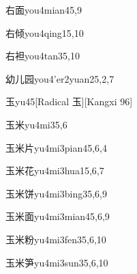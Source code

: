 \begin{verbete}{右面}{you4mian4}{5,9}
\end{verbete}

\begin{verbete}{右倾}{you4qing1}{5,10}
\end{verbete}

\begin{verbete}{右袒}{you4tan3}{5,10}
\end{verbete}

\begin{verbete}{幼儿园}{you4'er2yuan2}{5,2,7}
\end{verbete}

\begin{verbete}{玉}{yu4}{5}[Radical 玉][Kangxi 96]
\end{verbete}

\begin{verbete}{玉米}{yu4mi3}{5,6}
\end{verbete}

\begin{verbete}{玉米片}{yu4mi3pian4}{5,6,4}
\end{verbete}

\begin{verbete}{玉米花}{yu4mi3hua1}{5,6,7}
\end{verbete}

\begin{verbete}{玉米饼}{yu4mi3bing3}{5,6,9}
\end{verbete}

\begin{verbete}{玉米面}{yu4mi3mian4}{5,6,9}
\end{verbete}

\begin{verbete}{玉米粉}{yu4mi3fen3}{5,6,10}
\end{verbete}

\begin{verbete}{玉米笋}{yu4mi3sun3}{5,6,10}
\end{verbete}

